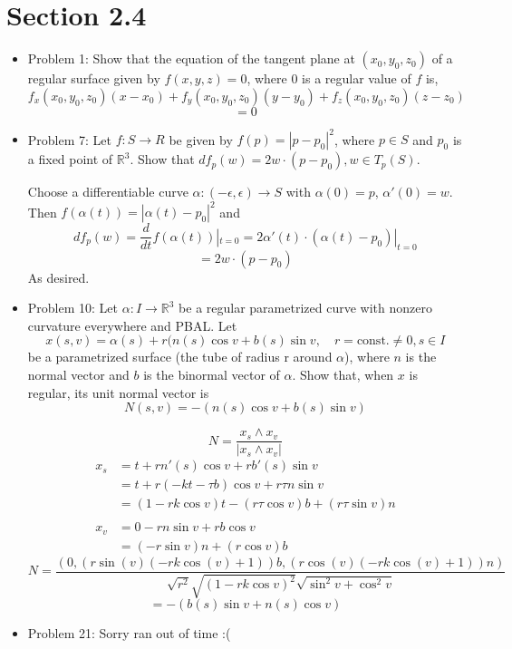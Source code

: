 \documentclass[a4paper,17pt]{extarticle}
\theoremstyle{definition}
\renewcommand{\skip}{\par\null\par}
\newcommand{\R}{\mathbb{R}}
\begin{document}
\section{Section 2.4}
\begin{itemize}
    \item Problem 1: Show that the equation of the tangent plane at $(x_0,y_0,z_0)$ of a regular surface given by $f(x,y,z)=0$, where 0 is a regular value of $f$ is, $$f_x(x_0,y_0,z_0)(x-x_0)+f_y(x_0,y_0,z_0)(y-y_0)+f_z(x_0,y_0,z_0)(z-z_0)$$ $$=0$$
    \item Problem 7: Let $f:S\to R$ be given by $f(p)=|p-p_0|^2$, where $p\in S$ and $p_0$ is a fixed point of $\R^3$. Show that $df_p(w)=2w\cdot(p-p_0),w\in T_p(S)$.\skip Choose a differentiable curve $\alpha:(-\epsilon,\epsilon)\to S$ with $\alpha(0)=p$, $\alpha'(0)=w$. Then $f(\alpha(t))=|\alpha(t)-p_0|^2$ and $$df_p(w)=\frac{d}{dt}f(\alpha(t))|_{t=0}=2\alpha'(t)\cdot(\alpha(t)-p_0)|_{t=0}$$ $$=2w\cdot(p-p_0)$$ As desired.
    \item Problem 10: Let $\alpha:I\to\R^3$ be a regular parametrized curve with nonzero curvature everywhere and PBAL. Let $$x(s,v)=\alpha(s)+r(n(s)\cos v+b(s)\sin v,\quad r=\text{const.}\neq0,s\in I$$ be a parametrized surface (the tube of radius r around $\alpha$), where $n$ is the normal vector and $b$ is the binormal vector of $\alpha$. Show that, when $x$ is regular, its unit normal vector is $$N(s,v)=-(n(s)\cos v+b(s)\sin v)$$\skip $$N=\frac{x_s\wedge x_v}{|x_s\wedge x_v|}$$\begin{align*}
        x_s &= t+rn'(s)\cos v+rb'(s)\sin v\\
        &= t+r(-kt-\tau b)\cos v+r\tau n\sin v\\
        &= (1-rk\cos v)t-(r\tau\cos v)b+(r\tau\sin v)n\\
        \\
        x_v &= 0-rn\sin v+rb\cos v\\
        &= (-r\sin v)n+(r\cos v)b
    \end{align*}
    $$N=\frac{(0,(r\sin \left(v\right)\left(-rk\cos \left(v\right)+1\right))b,(r\cos \left(v\right)\left(-rk\cos \left(v\right)+1\right))n)}{\sqrt{r^2}\sqrt{(1-rk\cos v)^2}\sqrt{\sin^2v+\cos^2v}}$$ $$=-(b(s)\sin v+n(s)\cos v)$$
    \item Problem 21: Sorry ran out of time :(
\end{itemize}
\end{document}
